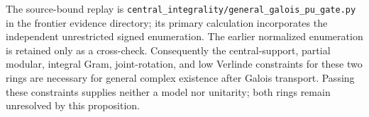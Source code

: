 The source-bound replay is
\texttt{central\_integrality/general\_galois\_pu\_gate.py} in the frontier
evidence directory; its primary calculation incorporates the independent
unrestricted signed enumeration. The earlier normalized enumeration is
retained only as a cross-check. Consequently the central-support, partial
modular, integral Gram, joint-rotation, and low Verlinde constraints for
these two rings are necessary for general complex existence after Galois
transport. Passing these constraints supplies neither a model nor
unitarity; both rings remain unresolved by this proposition.
